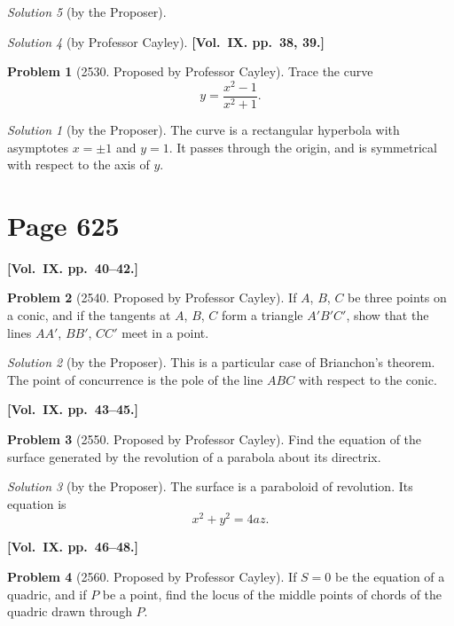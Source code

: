 \documentclass[12pt,a4paper]{article}
\theoremstyle{plain}
\theoremstyle{definition}
\newtheorem{problem}{Problem}
\theoremstyle{remark}
\newtheorem*{solution}{Solution}
\begin{document}
\begin{solution}[by the Proposer]
\begin{solution}[by Professor Cayley]
\medskip\noindent\textbf{[Vol.~IX. pp.~38, 39.]}

\begin{problem}[2530. Proposed by Professor Cayley]
Trace the curve
\[
y = \frac{x^2 - 1}{x^2 + 1}.
\]
\end{problem}

\begin{solution}[by the Proposer]
The curve is a rectangular hyperbola with asymptotes $x = \pm 1$ and $y = 1$. It passes through the origin, and is symmetrical with respect to the axis of $y$.
\end{solution}

\section*{Page 625}
\setcounter{page}{625}

\medskip\noindent\textbf{[Vol.~IX. pp.~40--42.]}

\begin{problem}[2540. Proposed by Professor Cayley]
If $A$, $B$, $C$ be three points on a conic, and if the tangents at $A$, $B$, $C$ form a triangle $A'B'C'$, show that the lines $AA'$, $BB'$, $CC'$ meet in a point.
\end{problem}

\begin{solution}[by the Proposer]
This is a particular case of Brianchon's theorem. The point of concurrence is the pole of the line $ABC$ with respect to the conic.
\end{solution}

\medskip\noindent\textbf{[Vol.~IX. pp.~43--45.]}

\begin{problem}[2550. Proposed by Professor Cayley]
Find the equation of the surface generated by the revolution of a parabola about its directrix.
\end{problem}

\begin{solution}[by the Proposer]
The surface is a paraboloid of revolution. Its equation is
\[
x^2 + y^2 = 4az.
\]
\end{solution}

\medskip\noindent\textbf{[Vol.~IX. pp.~46--48.]}

\begin{problem}[2560. Proposed by Professor Cayley]
If $S = 0$ be the equation of a quadric, and if $P$ be a point, find the locus of the middle points of chords of the quadric drawn through $P$.
\end{problem}


\end{solution}
\end{solution}
\end{document}
